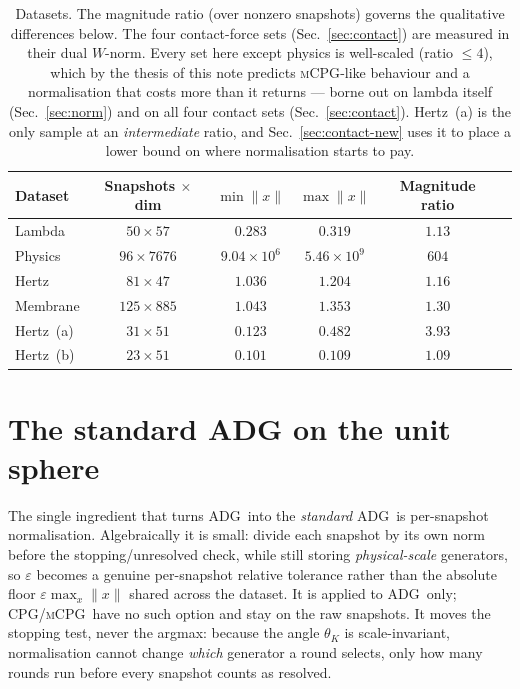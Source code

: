 \documentclass[11pt]{article}
\newcommand{\CPG}{\textsc{CPG}}
\newcommand{\ADG}{\textsc{ADG}}
\newcommand{\mCPG}{\textsc{mCPG}}
\begin{document}
\begin{table}[htbp]
  \centering
  \caption{Datasets. The magnitude ratio (over nonzero snapshots) governs the
    qualitative differences below. The four contact-force sets
    (Sec.~\ref{sec:contact}) are measured in their dual $W$-norm. Every set here
    except physics is well-scaled (ratio $\le4$), which by the thesis of this note
    predicts \mCPG-like behaviour and a normalisation that costs more than it
    returns --- borne out on lambda itself (Sec.~\ref{sec:norm}) and on all four
    contact sets (Sec.~\ref{sec:contact}). Hertz~(a) is the only sample at an
    \emph{intermediate} ratio, and Sec.~\ref{sec:contact-new} uses it to place a
    lower bound on where normalisation starts to pay.}
  \label{tab:datasets}
  \begin{tabular}{lccccc}
    \toprule
    Dataset & Snapshots $\times$ dim & $\min\|x\|$ & $\max\|x\|$ & Magnitude ratio \\
    \midrule
    Lambda   & $50\times57$   & $0.283$            & $0.319$            & $1.13$ \\
    Physics  & $96\times7676$ & $9.04\times10^{6}$ & $5.46\times10^{9}$ & $604$  \\
    \midrule
    Hertz      & $81\times47$   & $1.036$ & $1.204$ & $1.16$ \\
    Membrane   & $125\times885$ & $1.043$ & $1.353$ & $1.30$ \\
    Hertz~(a)  & $31\times51$   & $0.123$ & $0.482$ & $3.93$ \\
    Hertz~(b)  & $23\times51$   & $0.101$ & $0.109$ & $1.09$ \\
    \bottomrule
  \end{tabular}
\end{table}

\section{The standard ADG on the unit sphere}
\label{sec:geometry}

The single ingredient that turns \ADG\ into the \emph{standard} \ADG\ is
per-snapshot normalisation. Algebraically it is small: divide each snapshot by
its own norm before the stopping/unresolved check, while still storing
\emph{physical-scale} generators, so $\varepsilon$ becomes a genuine per-snapshot
relative tolerance rather than the absolute floor $\varepsilon\max_x\|x\|$ shared
across the dataset. It is applied to \ADG\ only; \CPG/\mCPG\ have no such option
and stay on the raw snapshots. It moves the stopping test, never the argmax:
because the angle $\theta_K$ is scale-invariant, normalisation cannot change
\emph{which} generator a round selects, only how many rounds run before every
snapshot counts as resolved.
\end{document}
